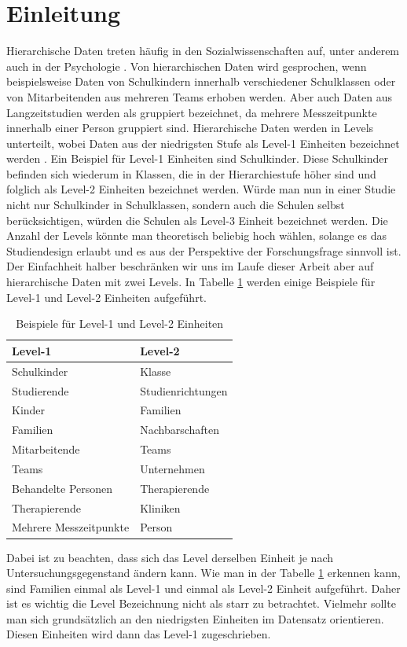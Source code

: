 \documentclass[12pt]{article}\usepackage[]{graphicx}\usepackage[]{color}
\begin{document}
\section{Einleitung}
Hierarchische Daten treten häufig in den Sozialwissenschaften auf, unter anderem auch in der Psychologie \citep{SnijdersTomA.B2012Ma:a}. Von hierarchischen Daten wird gesprochen, wenn beispielsweise Daten von Schulkindern innerhalb verschiedener Schulklassen oder von Mitarbeitenden aus mehreren Teams erhoben werden. Aber auch Daten aus Langzeitstudien werden als gruppiert bezeichnet, da mehrere Messzeitpunkte innerhalb einer Person gruppiert sind. Hierarchische Daten werden in Levels unterteilt, wobei Daten aus der niedrigsten Stufe als Level-1 Einheiten bezeichnet werden \citep{SnijdersTomA.B2012Ma:a}. Ein Beispiel für Level-1 Einheiten sind Schulkinder. Diese Schulkinder befinden sich wiederum in Klassen, die in der Hierarchiestufe höher sind und folglich als Level-2 Einheiten bezeichnet werden. Würde man nun in einer Studie nicht nur Schulkinder in Schulklassen, sondern auch  die Schulen selbst berücksichtigen, würden die Schulen als Level-3 Einheit bezeichnet werden. Die Anzahl der Levels könnte man theoretisch beliebig hoch wählen, solange es das Studiendesign erlaubt und es aus der Perspektive der Forschungsfrage sinnvoll ist. Der Einfachheit halber beschränken wir uns im Laufe dieser Arbeit aber auf hierarchische Daten mit zwei Levels. In Tabelle \ref{tab:beispiele_levels} werden einige Beispiele für Level-1 und Level-2 Einheiten aufgeführt. 
\begin{table}[b!]
\centering
\begin{threeparttable}
\caption{Beispiele für Level-1 und Level-2 Einheiten}
\begin{tabular}{ll}
\toprule
Level-1 				& Level-2 	\\
\midrule
Schulkinder 			& Klasse 	\\
Studierende 			& Studienrichtungen \\
Kinder 					& Familien 	\\
Familien 				& Nachbarschaften \\
Mitarbeitende			& Teams \\
Teams					& Unternehmen \\
Behandelte Personen	 	& Therapierende \\
Therapierende 			& Kliniken \\
Mehrere Messzeitpunkte 	& Person \\
\bottomrule
\end{tabular}
\label{tab:beispiele_levels}
\end{threeparttable}
\end{table}
Dabei ist zu beachten, dass sich das Level derselben Einheit je nach Untersuchungsgegenstand ändern kann. Wie man in der Tabelle \ref{tab:beispiele_levels} erkennen kann, sind Familien einmal als Level-1 und einmal als Level-2 Einheit aufgeführt. Daher ist es wichtig die Level Bezeichnung nicht als starr zu betrachtet. Vielmehr sollte man sich grundsätzlich an den niedrigsten Einheiten im Datensatz orientieren. Diesen Einheiten wird dann das Level-1 zugeschrieben.
\end{document}
